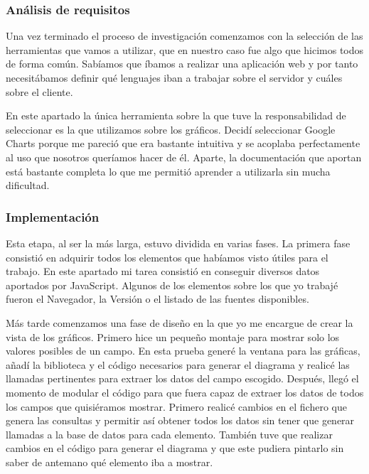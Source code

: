 \subsubsection{Análisis de requisitos}
Una vez terminado el proceso de investigación comenzamos con la selección de las herramientas que vamos a utilizar, que en nuestro caso fue algo que hicimos todos de forma común. Sabíamos que íbamos a realizar una aplicación web y por tanto necesitábamos definir qué lenguajes iban a trabajar sobre el servidor y cuáles sobre el cliente. \par
En este apartado la única herramienta sobre la que tuve la responsabilidad de seleccionar es la que utilizamos sobre los gráficos. Decidí seleccionar Google Charts porque me pareció que era bastante intuitiva y se acoplaba perfectamente al uso que nosotros queríamos hacer de él. Aparte, la documentación que aportan está bastante completa lo que me permitió aprender a utilizarla sin mucha dificultad.

\subsubsection{Implementación}
Esta etapa, al ser la más larga, estuvo dividida en varias fases. La primera fase consistió en adquirir todos los elementos que habíamos visto útiles para el trabajo. En este apartado mi tarea consistió en conseguir diversos datos aportados por JavaScript. Algunos de los elementos sobre los que yo trabajé fueron el Navegador, la Versión o el listado de las fuentes disponibles. \par
Más tarde comenzamos una fase de diseño en la que yo me encargue de crear la vista de los gráficos. Primero hice un pequeño montaje para mostrar solo los valores posibles de un campo. En esta prueba generé la ventana para las gráficas, añadí la biblioteca y el código necesarios para generar el diagrama y realicé las llamadas pertinentes para extraer los datos del campo escogido. Después, llegó el momento de modular el código para que fuera capaz de extraer los datos de todos los campos que quisiéramos mostrar. Primero realicé cambios en el fichero que genera las consultas y permitir así obtener todos los datos sin tener que generar llamadas a la base de datos para cada elemento. También tuve que realizar cambios en el código para generar el diagrama y que este pudiera pintarlo sin saber de antemano qué elemento iba a mostrar.

